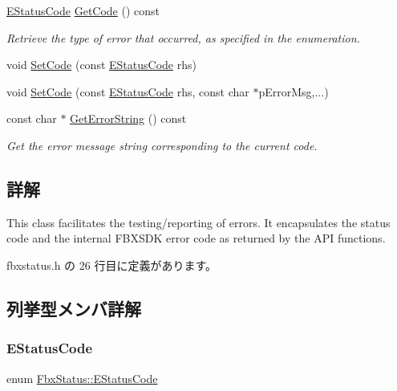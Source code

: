 \begin{DoxyCompactItemize}
\hyperlink{class_fbx_status_a6a631d5d95b28e31a19aabd5f5809ecc}{E\+Status\+Code} \hyperlink{class_fbx_status_a342ecfe81651d2c99785cac9592a41dc}{Get\+Code} () const
\begin{DoxyCompactList}\small\item\em Retrieve the type of error that occurred, as specified in the enumeration. \end{DoxyCompactList}\item 
void \hyperlink{class_fbx_status_a906fe62e4753eb13571c359daf07cbf3}{Set\+Code} (const \hyperlink{class_fbx_status_a6a631d5d95b28e31a19aabd5f5809ecc}{E\+Status\+Code} rhs)
\item 
void \hyperlink{class_fbx_status_a6991ae689fa0c9f5f72449f531772deb}{Set\+Code} (const \hyperlink{class_fbx_status_a6a631d5d95b28e31a19aabd5f5809ecc}{E\+Status\+Code} rhs, const char $\ast$p\+Error\+Msg,...)
\item 
const char $\ast$ \hyperlink{class_fbx_status_aa36b462a6c63105538c483518415fb66}{Get\+Error\+String} () const
\begin{DoxyCompactList}\small\item\em Get the error message string corresponding to the current code. \end{DoxyCompactList}\end{DoxyCompactItemize}


\subsection{詳解}
This class facilitates the testing/reporting of errors. It encapsulates the status code and the internal F\+B\+X\+S\+DK error code as returned by the A\+PI functions. 

 fbxstatus.\+h の 26 行目に定義があります。



\subsection{列挙型メンバ詳解}
\mbox{\label{class_fbx_status_a6a631d5d95b28e31a19aabd5f5809ecc}} 
\subsubsection{\texorpdfstring{E\+Status\+Code}{EStatusCode}}
{\footnotesize\ttfamily enum \hyperlink{class_fbx_status_a6a631d5d95b28e31a19aabd5f5809ecc}{Fbx\+Status\+::\+E\+Status\+Code}}



